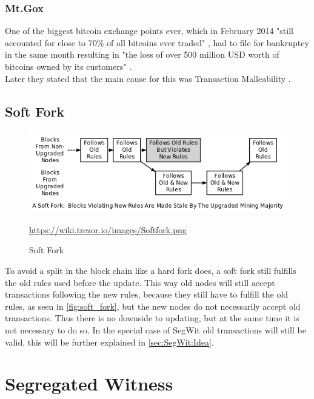 \subsubsection{Mt.Gox}
One of the biggest bitcoin exchange points ever, which in February 2014 "still accounted for close to 70\% of all bitcoins ever traded" \cite{springer:malleability_and_mtgox}, had to file for bankruptcy in the same month resulting in "the loss of over 500 million USD worth of bitcoins owned by its customers" \cite{springer:malleability_and_mtgox}. \\
Later they stated that the main cause for this was Transaction Malleability \cite{springer:malleability_and_mtgox}.

\subsection{Soft Fork}
\label{sec:Basics:SoftFork}
\begin{figure}[!ht]
    \centering
    \includegraphics[width=(\textwidth * 2 / 3 )]{Ausarbeitung/images/Softfork.png}
    \caption[Soft Fork]{Soft Fork}
    \small \url{https://wiki.trezor.io/images/Softfork.png} 
    \label{fig:soft_fork}
\end{figure}
To avoid a split in the block chain like a hard fork does, a soft fork still fulfills the old rules used before the update. This way old nodes will still accept transactions following the new rules, because they still have to fulfill the old rules, as seen in \autoref{fig:soft_fork}, but the new nodes do not necessarily accept old transactions.
Thus there is no downside to updating, but at the same time it is not necessary to do so. In the special case of SegWit old transactions will still be valid, this will be further explained in \autoref{sec:SegWit:Idea}.


\section{Segregated Witness}
\label{ch:SegWit}


